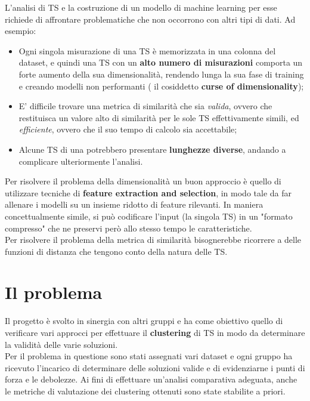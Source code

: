 L'analisi di TS e la costruzione di un modello di machine learning per esse richiede di affrontare problematiche che non occorrono con altri tipi di dati. Ad esempio:
\begin{itemize}
	\item Ogni singola misurazione di una TS è memorizzata in una colonna del dataset, e quindi una TS con un \textbf{alto numero di misurazioni} comporta un forte aumento della sua dimensionalità, rendendo lunga la sua fase di training e creando modelli non performanti ( il cosiddetto \textbf{curse of dimensionality});
	\item E' difficile trovare una metrica di similarità che sia \textit{valida}, ovvero che restituisca un valore alto di similarità per le sole TS effettivamente simili, ed \textit{efficiente}, ovvero che il suo tempo di calcolo sia accettabile;
	\item Alcune TS di una potrebbero presentare \textbf{lunghezze diverse}, andando a complicare ulteriormente l'analisi.
\end{itemize}
Per risolvere il problema della dimensionalità un buon approccio è quello di utilizzare tecniche di \textbf{feature extraction and selection}, in modo tale da far allenare i modelli su un insieme ridotto di feature rilevanti. In maniera concettualmente simile, si può codificare l'input (la singola TS) in un "formato compresso" che ne preservi però allo stesso tempo le caratteristiche.\\
Per risolvere il problema della metrica di similarità bisognerebbe ricorrere a delle funzioni di distanza che tengono conto della natura delle TS.\\

\section{Il problema}
Il progetto è svolto in sinergia con altri gruppi e ha come obiettivo quello di verificare vari approcci per effettuare il \textbf{clustering} di TS  in modo da determinare la validità delle varie soluzioni.\\
Per il problema in questione sono stati assegnati vari dataset e ogni gruppo ha ricevuto l'incarico di determinare delle soluzioni valide e di evidenziarne i punti di forza e le debolezze. Ai fini di effettuare un'analisi comparativa adeguata, anche le metriche di valutazione dei clustering ottenuti sono state stabilite a priori.


